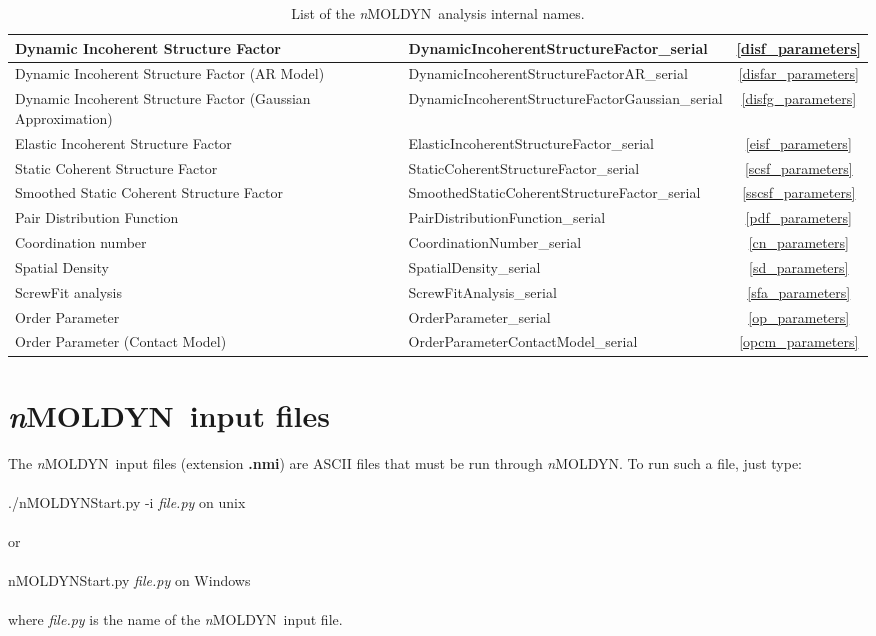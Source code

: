 \documentclass[a4paper,11pt]{report}
\newcommand{\NMOLDYN}{\textit{n}MOLDYN}
\begin{document}
\begin{table}[h!]
\begin{tabular}{|p{6cm}|p{8cm}|c|}
    \hline
    Dynamic Incoherent Structure Factor & DynamicIncoherentStructureFactor\_serial & \ref{disf_parameters} \\
    \hline
    Dynamic Incoherent Structure Factor (AR Model) & DynamicIncoherentStructureFactorAR\_serial & \ref{disfar_parameters} \\
    \hline
    Dynamic Incoherent Structure Factor (Gaussian Approximation) & DynamicIncoherentStructureFactorGaussian\_serial & \ref{disfg_parameters} \\
    \hline
    Elastic Incoherent Structure Factor & ElasticIncoherentStructureFactor\_serial & \ref{eisf_parameters} \\
    \hline
    Static Coherent Structure Factor & StaticCoherentStructureFactor\_serial & \ref{scsf_parameters} \\
    \hline
    Smoothed Static Coherent Structure Factor & SmoothedStaticCoherentStructureFactor\_serial & \ref{sscsf_parameters} \\
    \hline
    Pair Distribution Function & PairDistributionFunction\_serial & \ref{pdf_parameters} \\
    \hline
    Coordination number & CoordinationNumber\_serial & \ref{cn_parameters} \\
    \hline
    Spatial Density & SpatialDensity\_serial & \ref{sd_parameters} \\
    \hline
    ScrewFit analysis & ScrewFitAnalysis\_serial & \ref{sfa_parameters} \\
    \hline
    Order Parameter & OrderParameter\_serial & \ref{op_parameters} \\
    \hline
    Order Parameter (Contact Model) & OrderParameterContactModel\_serial & \ref{opcm_parameters} \\
    \hline
    \end{tabular}
    \caption[\NMOLDYN\ analysis internal names]{List of the \NMOLDYN\ analysis internal names.}
    \label{tab:nmoldyn_analysis_name}
\end{table}
\newpage
\section{\NMOLDYN\ input files}
\label{nmoldyn_input_files}
The \NMOLDYN\ input files (extension \textbf{.nmi}) are ASCII files that must be run through \NMOLDYN . To run such a file, 
just type:
\\
\\
{\ttfamily ./nMOLDYNStart.py -i \textit{file.py}} on unix
\\\\
or
\\\\
{\ttfamily nMOLDYNStart.py \textit{file.py}} on Windows
\\
\\
where \textit{file.py} is the name of the \NMOLDYN\ input file.
\end{document}
